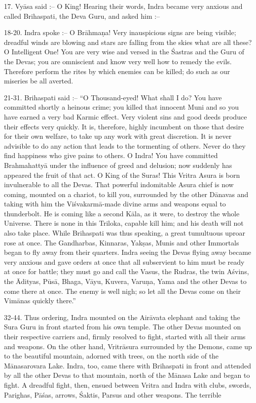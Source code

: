 17. Vy\=asa said :-- O King! Hearing their words, Indra became very anxious and called Brihaspati, the Deva Guru, and asked him :--

18-20. Indra spoke :-- O Br\=ahma\d{n}a! Very inauspicious signs are being visible; dreadful winds are blowing and stars are falling from the skies what are all these? O Intelligent One! You are very wise and versed in the \'Sastras and the Guru of the Devas; you are omniscient and know very well how to remedy the evils. Therefore perform the rites by which enemies can be killed; do such as our miseries be all averted.

21-31. Brihaspati said :-- ``O Thousand-eyed! What shall I do? You have committed shortly a heinous crime; you killed that innocent Muni and so you have earned a very bad Karmic effect. Very violent sins and good deeds produce their effects very quickly. It is, therefore, highly incumbent on those that desire for their own welfare, to take up any work with great discretion. It is never advisible to do any action that leads to the tormenting of others. Never do they find happiness who give pains to others. O Indra! You have committed Brahmahatty\=a under the influence of greed and delusion; now suddenly has appeared the fruit of that act. O King of the Suras! This Vritra Asura is born invulnerable to all the Devas. That powerful indomitable Asura chief is now coming, mounted on a chariot, to kill you, surrounded by the other D\=anavas and taking with him the Vi\'svakarm\=a-made divine arms and weapons equal to thunderbolt. He is coming like a second K\=ala, as it were, to destroy the whole Universe. There is none in this Triloka, capable kill him; and his death will not also take place. While Brihaspati was thus speaking, a great tumultuous uproar rose at once. The Gandharbas, Kinnaras, Yak\d{s}as, Munis and other Immortals began to fly away from their quarters. Indra seeing the Devas flying away became very anxious and gave orders at once that all subservient to him must be ready at once for battle; they must go and call the Vasus, the Rudras, the twin A\'svins, the \=Adityas, P\=us\=a, Bhaga, V\=ayu, Kuvera, Varu\d{n}a, Yama and the other Devas to come there at once. The enemy is well nigh; so let all the Devas come on their Vim\=anas quickly there.''

32-44. Thus ordering, Indra mounted on the Air\=avata elephant and taking the Sura Guru in front started from his own temple. The other Devas mounted on their respective carriers and, firmly resolved to fight, started with all their arms and weapons. On the other hand, Vritr\=asura surrounded by the Demons, came up to the beautiful mountain, adorned with trees, on the north side of the M\=anasarovara Lake. Indra, too, came there with Brihaspati in front and attended by all the other Devas to that mountain, north of the M\=anasa Lake and began to fight. A dreadful fight, then, ensued between Vritra and Indra with clubs, swords, Parighas, P\=a\'sas, arrows, \'Saktis, Parsus and other weapons. The terrible

